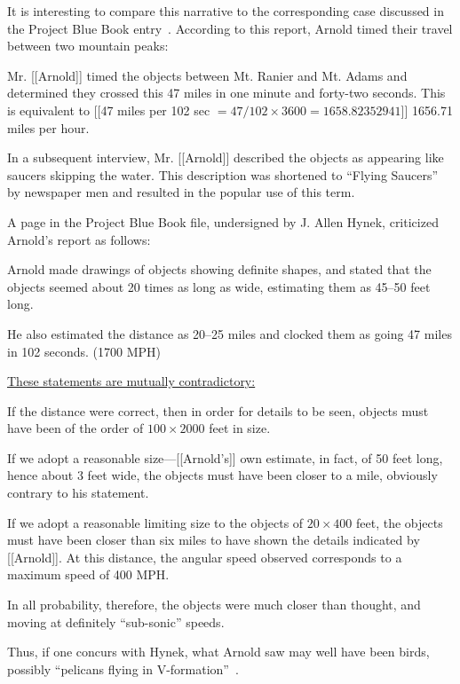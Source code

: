 It is interesting to compare this narrative to the corresponding case discussed in the Project Blue Book entry~\cite{1947-KA-PBB}.
According to this report, Arnold timed their travel between two mountain peaks:
\begin{svgraybox}
Mr. [[Arnold]] timed the objects between Mt. Ranier and Mt. Adams and determined they crossed this 47 miles in one minute and forty-two seconds.
This is equivalent to [[47 miles per 102 sec $= 47/102 \times 3600=1658.82352941$]] 1656.71 miles per hour.

In a subsequent interview, Mr. [[Arnold]] described the objects as appearing like saucers skipping the water.
This description was shortened to ``Flying Saucers'' by newspaper men and resulted in the popular use of this term.
\end{svgraybox}

A page in the Project Blue Book file, undersigned by J. Allen Hynek, criticized Arnold's report as follows:
\begin{svgraybox}
Arnold made drawings of objects showing definite shapes,
and stated that the objects seemed about 20 times as long as wide, estimating them as 45--50 feet long.

He also estimated the distance as 20--25 miles and clocked them as going 47 miles in 102 seconds. (1700 MPH)

\underline{These statements are mutually contradictory:}

If the distance were correct, then in order for details to be seen, objects must have been of the order of $ 100 \times 2000 $ feet in size.

If we adopt a reasonable size---[[Arnold's]] own estimate, in fact, of 50 feet long, hence about 3 feet wide, the objects must have been closer to a mile,
obviously contrary to his statement.

If we adopt a reasonable limiting size to the objects of $ 20 \times 400 $ feet,
the objects must have been closer than six miles to have shown the details indicated by [[Arnold]].
At this distance, the angular speed observed corresponds to a maximum speed of 400 MPH.

In all probability, therefore, the objects were much closer than thought, and moving at definitely ``sub-sonic'' speeds.
\end{svgraybox}

Thus, if one concurs with Hynek, what Arnold saw may well have been birds, possibly ``pelicans flying in V-formation''~\cite{Maccabee2017Jun}.

